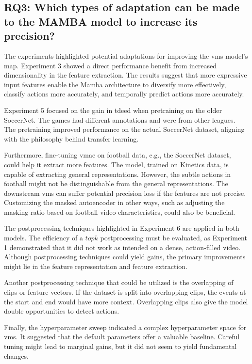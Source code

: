 \subsection{RQ3: Which types of adaptation can be made to the MAMBA model to increase its precision?}

The experiments highlighted potential adaptations for improving the \acrshort{vms} model's \acrshort{map}. Experiment 3 showed a direct performance benefit from increased dimensionality in the feature extraction. The results suggest that more expressive input features enable the Mamba architecture to diversify more effectively, classify actions more accurately, and temporally predict actions more accurately. 

Experiment 5 focused on the gain in \acrshort{tdeed} when pretraining on the older SoccerNet. The games had different annotations and were from other leagues. The pretraining improved performance on the actual SoccerNet dataset, aligning with the philosophy behind transfer learning. 

Furthermore, fine-tuning \acrshort{vmae} on football data, e.g., the SoccerNet dataset, could help it extract more features. The model,  trained on Kinetics data, is capable of extracting general representations. However, the subtle actions in football might not be distinguishable from the general representations. The downstream \acrshort{vms} can suffer potential precision loss if the features are not precise. Customizing the masked autoencoder in other ways, such as adjusting the masking ratio based on football video characteristics, could also be beneficial. 

The postprocessing techniques highlighted in Experiment 6 are applied in both models. The efficiency of a $topk$ postprocessing must be evaluated, as Experiment 1 demonstrated that it did not work as intended on a dense, action-filled video. Although postprocessing techniques could yield gains, the primary improvements might lie in the feature representation and feature extraction. 

Another postprocessing technique that could be utilized is the overlapping of clips or feature vectors. If the dataset is split into overlapping clips, the events at the start and end would have more context. Overlapping clips also give the model double opportunities to detect actions.

Finally, the hyperparameter sweep indicated a complex hyperparameter space for \acrshort{vms}. It suggested that the default parameters offer a valuable baseline. Careful tuning might lead to marginal gains, but it did not seem to yield fundamental changes. 

